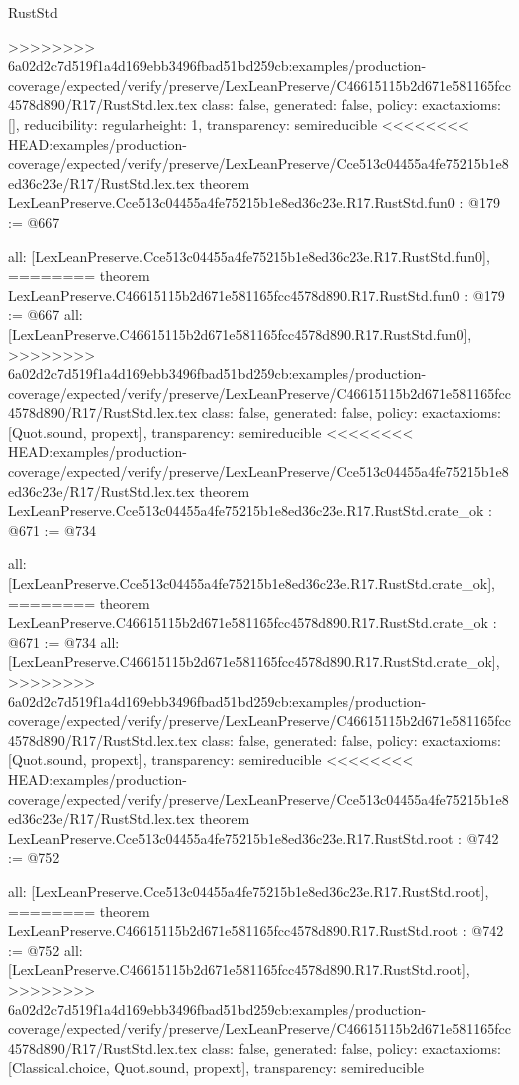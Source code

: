 \begin{lexlean}{RustStd}
\begin{coremodule}
{\begin{coremodule}
{{{>>>>>>>> 6a02d2c7d519f1a4d169ebb3496fbad51bd259cb:examples/production-coverage/expected/verify/preserve/LexLeanPreserve/C46615115b2d671e581165fcc4578d890/R17/RustStd.lex.tex
  class: false,
  generated: false,
  policy: exact{axioms: []},
  reducibility: regular{height: 1},
  transparency: semireducible
}
<<<<<<<< HEAD:examples/production-coverage/expected/verify/preserve/LexLeanPreserve/Cce513c04455a4fe75215b1e8ed36c23e/R17/RustStd.lex.tex
theorem LexLeanPreserve.Cce513c04455a4fe75215b1e8ed36c23e.R17.RustStd.fun0 : @179 := @667 {
  all: [LexLeanPreserve.Cce513c04455a4fe75215b1e8ed36c23e.R17.RustStd.fun0],
========
theorem LexLeanPreserve.C46615115b2d671e581165fcc4578d890.R17.RustStd.fun0 : @179 := @667 {
  all: [LexLeanPreserve.C46615115b2d671e581165fcc4578d890.R17.RustStd.fun0],
>>>>>>>> 6a02d2c7d519f1a4d169ebb3496fbad51bd259cb:examples/production-coverage/expected/verify/preserve/LexLeanPreserve/C46615115b2d671e581165fcc4578d890/R17/RustStd.lex.tex
  class: false,
  generated: false,
  policy: exact{axioms: [Quot.sound, propext]},
  transparency: semireducible
}
<<<<<<<< HEAD:examples/production-coverage/expected/verify/preserve/LexLeanPreserve/Cce513c04455a4fe75215b1e8ed36c23e/R17/RustStd.lex.tex
theorem LexLeanPreserve.Cce513c04455a4fe75215b1e8ed36c23e.R17.RustStd.crate_ok : @671 := @734 {
  all: [LexLeanPreserve.Cce513c04455a4fe75215b1e8ed36c23e.R17.RustStd.crate_ok],
========
theorem LexLeanPreserve.C46615115b2d671e581165fcc4578d890.R17.RustStd.crate_ok : @671 := @734 {
  all: [LexLeanPreserve.C46615115b2d671e581165fcc4578d890.R17.RustStd.crate_ok],
>>>>>>>> 6a02d2c7d519f1a4d169ebb3496fbad51bd259cb:examples/production-coverage/expected/verify/preserve/LexLeanPreserve/C46615115b2d671e581165fcc4578d890/R17/RustStd.lex.tex
  class: false,
  generated: false,
  policy: exact{axioms: [Quot.sound, propext]},
  transparency: semireducible
}
<<<<<<<< HEAD:examples/production-coverage/expected/verify/preserve/LexLeanPreserve/Cce513c04455a4fe75215b1e8ed36c23e/R17/RustStd.lex.tex
theorem LexLeanPreserve.Cce513c04455a4fe75215b1e8ed36c23e.R17.RustStd.root : @742 := @752 {
  all: [LexLeanPreserve.Cce513c04455a4fe75215b1e8ed36c23e.R17.RustStd.root],
========
theorem LexLeanPreserve.C46615115b2d671e581165fcc4578d890.R17.RustStd.root : @742 := @752 {
  all: [LexLeanPreserve.C46615115b2d671e581165fcc4578d890.R17.RustStd.root],
>>>>>>>> 6a02d2c7d519f1a4d169ebb3496fbad51bd259cb:examples/production-coverage/expected/verify/preserve/LexLeanPreserve/C46615115b2d671e581165fcc4578d890/R17/RustStd.lex.tex
  class: false,
  generated: false,
  policy: exact{axioms: [Classical.choice, Quot.sound, propext]},
  transparency: semireducible
}

}}}}}
\end{coremodule}}
\end{coremodule}
\end{lexlean}
